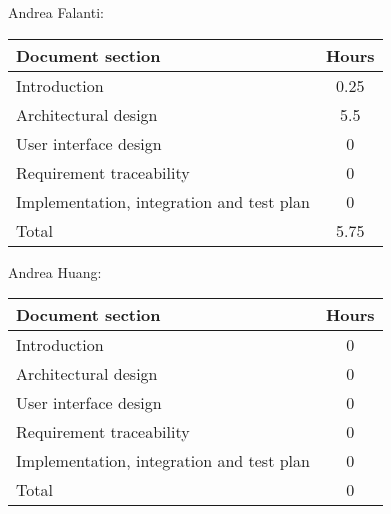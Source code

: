 Andrea Falanti:

\begin{tabular}{|l|c|}
    \hline
    Document section & Hours \\
    \hline
     Introduction & 0.25\\
     Architectural design & 5.5\\
     User interface design & 0\\
     Requirement traceability & 0\\
     Implementation, integration and test plan & 0\\
     \hline
     Total & 5.75\\
     \hline
\end{tabular}
\vskip 0.3in

Andrea Huang:

\begin{tabular}{|l|c|}
    \hline
    Document section & Hours \\
    \hline
     Introduction & 0\\
     Architectural design & 0\\
     User interface design & 0\\
     Requirement traceability & 0\\
     Implementation, integration and test plan & 0\\
     \hline
     Total & 0\\
     \hline
\end{tabular}